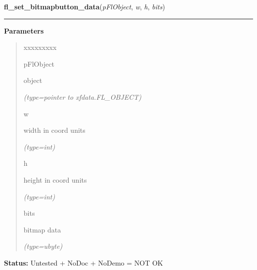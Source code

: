 \hspace{.8\funcindent}\begin{boxedminipage}{\funcwidth}

    \raggedright \textbf{fl\_set\_bitmapbutton\_data}(\textit{pFlObject}, \textit{w}, \textit{h}, \textit{bits})

    \vspace{-1.5ex}

    \rule{\textwidth}{0.5\fboxrule}
\setlength{\parskip}{2ex}
\setlength{\parskip}{1ex}
      \textbf{Parameters}
      \vspace{-1ex}

      \begin{quote}
        \begin{Ventry}{xxxxxxxxx}

          \item[pFlObject]

          object

            {\it (type=pointer to xfdata.FL\_OBJECT)}

          \item[w]

          width in coord units

            {\it (type=int)}

          \item[h]

          height in coord units

            {\it (type=int)}

          \item[bits]

          bitmap data

            {\it (type=ubyte)}

        \end{Ventry}

      \end{quote}

\textbf{Status:} Untested + NoDoc + NoDemo = NOT OK



    \end{boxedminipage}

    \label{xformslib:flbutton:fl_add_pixmapbutton}

    \vspace{0.5ex}

